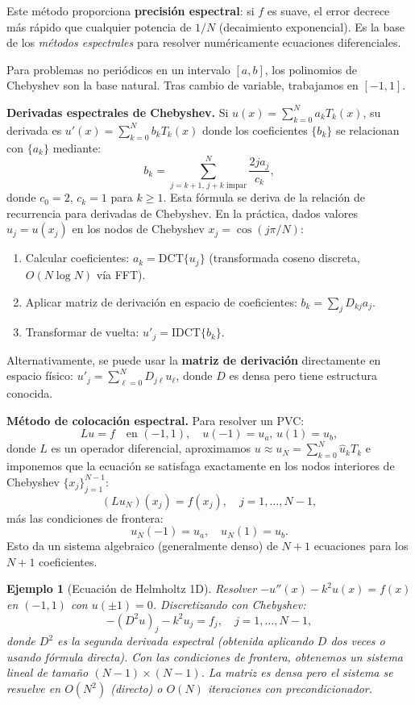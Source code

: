 \documentclass[a4paper,11pt]{report}
\newtheorem{example}[theorem]{Ejemplo}
\begin{document}
Este método proporciona \textbf{precisión espectral}: si $f$ es suave, el error decrece más rápido que cualquier potencia de $1/N$ (decaimiento exponencial). Es la base de los \emph{métodos espectrales} para resolver numéricamente ecuaciones diferenciales.

Para problemas no periódicos en un intervalo $[a,b]$, los polinomios de Chebyshev son la base natural. Tras cambio de variable, trabajamos en $[-1,1]$.

\textbf{Derivadas espectrales de Chebyshev.} Si $u(x) = \sum_{k=0}^N a_k T_k(x)$, su derivada es $u'(x) = \sum_{k=0}^N b_k T_k(x)$ donde los coeficientes $\{b_k\}$ se relacionan con $\{a_k\}$ mediante:
\[
b_k = \sum_{j=k+1, \, j+k \text{ impar}}^N \frac{2j a_j}{c_k},
\]
donde $c_0 = 2$, $c_k = 1$ para $k \geq 1$. Esta fórmula se deriva de la relación de recurrencia para derivadas de Chebyshev. En la práctica, dados valores $u_j = u(x_j)$ en los nodos de Chebyshev $x_j = \cos(j\pi/N)$:
\begin{enumerate}
\item Calcular coeficientes: $a_k = \text{DCT}\{u_j\}$ (transformada coseno discreta, $O(N \log N)$ vía FFT).
\item Aplicar matriz de derivación en espacio de coeficientes: $b_k = \sum_j D_{kj} a_j$.
\item Transformar de vuelta: $u'_j = \text{IDCT}\{b_k\}$.
\end{enumerate}

Alternativamente, se puede usar la \textbf{matriz de derivación} directamente en espacio físico: $u'_j = \sum_{\ell=0}^N D_{j\ell} u_\ell$, donde $D$ es densa pero tiene estructura conocida.

\textbf{Método de colocación espectral.} Para resolver un PVC:
\[
Lu = f \quad \text{en } (-1,1), \quad u(-1) = u_a, \, u(1) = u_b,
\]
donde $L$ es un operador diferencial, aproximamos $u \approx u_N = \sum_{k=0}^N \hat{u}_k T_k$ e imponemos que la ecuación se satisfaga exactamente en los nodos interiores de Chebyshev $\{x_j\}_{j=1}^{N-1}$:
\[
(Lu_N)(x_j) = f(x_j), \quad j = 1, \ldots, N-1,
\]
más las condiciones de frontera:
\[
u_N(-1) = u_a, \quad u_N(1) = u_b.
\]
Esto da un sistema algebraico (generalmente denso) de $N+1$ ecuaciones para los $N+1$ coeficientes.

\begin{example}[Ecuación de Helmholtz 1D]
Resolver $-u''(x) - k^2 u(x) = f(x)$ en $(-1,1)$ con $u(\pm 1) = 0$. Discretizando con Chebyshev:
\[
-(D^2 u)_j - k^2 u_j = f_j, \quad j = 1, \ldots, N-1,
\]
donde $D^2$ es la segunda derivada espectral (obtenida aplicando $D$ dos veces o usando fórmula directa). Con las condiciones de frontera, obtenemos un sistema lineal de tamaño $(N-1) \times (N-1)$. La matriz es densa pero el sistema se resuelve en $O(N^2)$ (directo) o $O(N)$ iteraciones con precondicionador.
\end{example}
\end{document}
